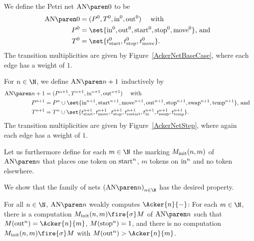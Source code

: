 \documentclass[../../diss.tex]{subfiles}
\begin{document}
\begin{definition}%
\label{Definition:PNAckermann}%
    We define the Petri net $\AckerNet{0}$ to be
    \begin{align*}
        \AckerNet{0} &= (P^0,T^0,\i^0,\o^0) \quad \text{ with }\\
        P^0 &= \set{ \pin^0, \pout^0, \pstart^0, \pstop^0, \pcopy^0 }\text{, and} \\
        T^0 &= \set{ \tstart^0, \tstop^0, \tcopy^0 }.
    \end{align*}
    The transition multiplicities are given by Figure~\ref{AckerNetBaseCase}, where each edge has a weight of $1$.

    For $n \in \N$, we define $\AckerNet{n+1}$ inductively by
    \begin{align*}
        \AckerNet{n+1}
        &= (P^{n+1},T^{n+1},\i^{n+1},\o^{n+1})
        \quad \text{ with }
        \\
        P^{n+1}
        &= P^n \cup \set{ \pin^{n+1}, \pstart^{n+1}, \pcopy^{n+1}, \pout^{n+1}, \pstop^{n+1},\pswap^{n+1}, \ptmp^{n+1}}\text{, and}
        \\
        T^{n+1}
        &= T^n \cup\set{ \tstart^{n+1}, \tcopy^{n+1}, \tstop^{n+1},\trestart^{n+1},\tin^{n+1}, \tswap^{n+1}, \ttmp^{n+1} }.
    \end{align*}
    The transition multiplicities are given by Figure~\ref{AckerNetStep}, where again each edge has a weight of $1$.

    Let us furthermore define for each $m \in \N$ the marking $M_{\text{init}}(n,m)$ of $\AckerNet{n}$ that places one token on $\text{start}^{n}$, $m$ tokens on $\text{in}^{n}$ and no token elsewhere.
\end{definition}

We show that the family of nets ${(\AckerNet{n})}_{n \in \N}$ has the desired property.

\begin{lemma}%
\label{Lemma:PNWeaklyComputeAckermann}%
    For all $n \in \N$, $\AckerNet{n}$ weakly computes $\Acker{n}{-}$:
    For each $m \in \N$, there is a computation $\Minit(n,m) \fire{\sigma} M$ of $\AckerNet{n}$ such that $M(\pout^n) = \Acker{n}{m}$, $M(\text{stop}^n) = 1$, and there is no computation $\Minit(n,m) \fire{\sigma} M$ with $M(\pout^n) > \Acker{n}{m}$.
\end{lemma}
\end{document}
